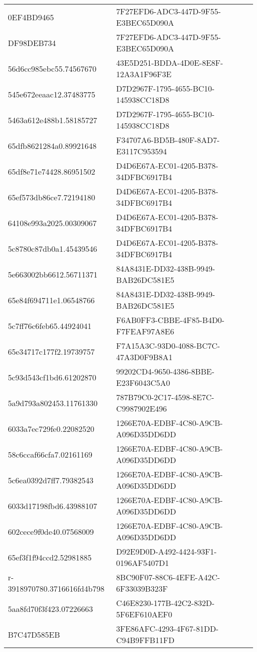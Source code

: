 \begin{tabular}{ll}
0EF4BD9465 & 7F27EFD6-ADC3-447D-9F55-E3BEC65D090A \\
DF98DEB734 & 7F27EFD6-ADC3-447D-9F55-E3BEC65D090A \\
56d6cc985ebc55.74567670 & 43E5D251-BDDA-4D0E-8E8F-12A3A1F96F3E \\
545e672eeaac12.37483775 & D7D2967F-1795-4655-BC10-145938CC18D8 \\
5463a612e488b1.58185727 & D7D2967F-1795-4655-BC10-145938CC18D8 \\
65dfb8621284a0.89921648 & F34707A6-BD5B-480F-8AD7-E3117C953594 \\
65df8e71e74428.86951502 & D4D6E67A-EC01-4205-B378-34DFBC6917B4 \\
65ef573db86ce7.72194180 & D4D6E67A-EC01-4205-B378-34DFBC6917B4 \\
64108e993a2025.00309067 & D4D6E67A-EC01-4205-B378-34DFBC6917B4 \\
5c8780c87db0a1.45439546 & D4D6E67A-EC01-4205-B378-34DFBC6917B4 \\
5e663002bb6612.56711371 & 84A8431E-DD32-438B-9949-BAB26DC581E5 \\
65e84f694711e1.06548766 & 84A8431E-DD32-438B-9949-BAB26DC581E5 \\
5c7ff76c6feb65.44924041 & F6AB0FF3-CBBE-4F85-B4D0-F7FEAF97A8E6 \\
65e34717c177f2.19739757 & F7A15A3C-93D0-4088-BC7C-47A3D0F9B8A1 \\
5c93d543cf1bd6.61202870 & 99202CD4-9650-4386-8BBE-E23F6043C5A0 \\
5a9d793a802453.11761330 & 787B79C0-2C17-4598-8E7C-C9987902E496 \\
6033a7ec729fe0.22082520 & 1266E70A-EDBF-4C80-A9CB-A096D35DD6DD \\
58c6ccaf66cfa7.02161169 & 1266E70A-EDBF-4C80-A9CB-A096D35DD6DD \\
5c6ea0392d7ff7.79382543 & 1266E70A-EDBF-4C80-A9CB-A096D35DD6DD \\
6033d17198fbd6.43988107 & 1266E70A-EDBF-4C80-A9CB-A096D35DD6DD \\
602cece9f0de40.07568009 & 1266E70A-EDBF-4C80-A9CB-A096D35DD6DD \\
65ef3f1f94ccd2.52981885 & D92E9D0D-A492-4424-93F1-0196AF5407D1 \\
r-3918970780.3716616fd4b798 & 8BC90F07-88C6-4EFE-A42C-6F33039B323F \\
5aa8fd70f3f423.07226663 & C46E8230-177B-42C2-832D-5F6EF610AEF0 \\
B7C47D585EB & 3FE86AFC-4293-4F67-81DD-C94B9FFB11FD \\

\end{tabular}
